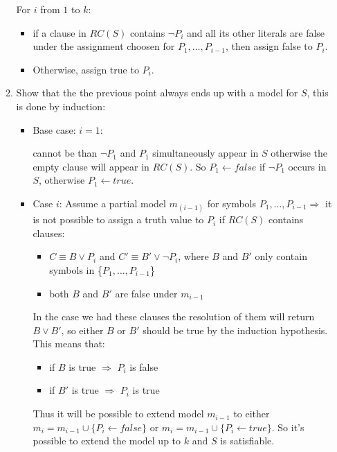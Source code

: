 \documentclass[12pt]{article}
\begin{document}
\begin{enumerate}[label=\textbf{PL.\arabic*}]
\begin{enumerate}
        For $i$ from $1$ to $k$:
        \begin{itemize}
            \item if a clause in $RC(S)$ contains $\lnot P_i$ and all its other literals are false under the assignment choosen for $P_1,\ldots,P_{i-1}$, 
            then assign false to $P_i$.
            \item Otherwise, assign true to $P_i$.       
        \end{itemize}
        \item Show that the the previous point always ends up with a model for $S$, this is done by induction:
        \begin{itemize}
            \item Base case: $i = 1$:
            
            cannot be than $\lnot P_1$ and $P_1$ simultaneously appear in $S$ otherwise the empty clause will appear in $RC(S)$.
            So $P_1 \leftarrow false$ if $\lnot P_1$ occurs in $S$, otherwise $P_1 \leftarrow true$.
            \item Case $i$: Assume a partial model $m_(i-1)$ for symbols $P_1,\ldots,P_{i-1}\Rightarrow$ it is not possible to assign a truth value to $P_i$ if $RC(S)$
            contains clauses:
            \begin{itemize}
                \item $C\equiv B\lor P_i$ and $C'\equiv B'\lor\lnot P_i$, where $B$ and $B'$ only contain symbols in \{$P_1,\ldots,P_{i-1}$\}
                \item both $B$ and $B'$ are false under $m_{i-1}$
            \end{itemize}
            In the case we had these clauses the resolution of them will return $B\lor B'$, so either $B$ or $B'$ should be true by the induction hypothesis. 
            This means that:
            \begin{itemize}
                \item if $B$ is true $\Rightarrow$ $P_i$ is false
                \item if $B'$ is true $\Rightarrow$ $P_i$ is true
            \end{itemize}
            Thus it will be possible to extend model $m_{i-1}$ to either $m_i = m_{i-1}\cup\{P_i \leftarrow false\}$ or $m_i = m_{i-1}\cup\{P_i \leftarrow true\}$.
            So it's possible to extend the model up to $k$ and $S$ is satisfiable.
        \end{itemize}
    \end{enumerate}
\end{enumerate}
\end{document}

